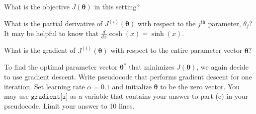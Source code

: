 \documentclass[11pt,addpoints,answers]{exam}
\begin{document}
\begin{questions}
\begin{parts}
    \begin{subparts}
        \subpart[2]  
        What is the objective $J(\bm\theta)$ in this setting? 
        
        \begin{your_solution}[title=Your answer:,height=4cm,width=15cm]
        \end{your_solution}
        
        \subpart[3] 
         What is the partial derivative of $J^{(i)}(\bm\theta)$ with respect to the $j^{\textrm{th}}$ parameter, $\theta_j$? It may be helpful to know that $\frac{d}{dx}\cosh(x) = \sinh(x)$. 
         
        \begin{your_solution}[title=Your answer:,height=6cm,width=15cm]
        \end{your_solution}
        
        \subpart[2] 
         What is the gradient of $J^{(i)}(\bm\theta)$ with respect to the entire parameter vector $\bm\theta$?
         
        \begin{your_solution}[title=Your answer:,height=4cm,width=15cm]
        \end{your_solution}
        
        \subpart[2] To find the optimal parameter vector $\bm\theta^*$ that minimizes $J(\bm\theta)$, we again decide to use gradient descent. Write pseudocode that performs gradient descent for one iteration. Set learning rate $\alpha = 0.1$ and initialize $\bm\theta$ to be the zero vector. You may use $\texttt{gradient[i]}$ as a variable that contains your answer to part (c) in your pseudocode. Limit your answer to 10 lines.
        
        \begin{your_solution}[title=Your Answer,height=6cm,width=15cm]
            
        \begin{your_code_solution}

        \end{your_code_solution}
            
        \end{your_solution}
        
        
    \end{subparts}
    
\end{parts}



\end{questions}
\end{document}
